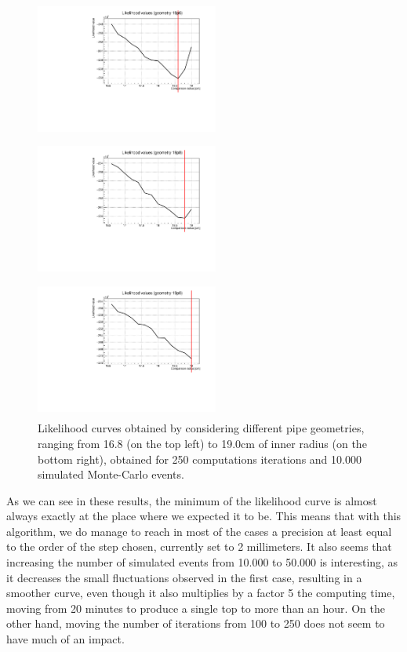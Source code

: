 \documentclass[a4paper, 11pt, twoside, openright]{report}
\begin{document}
\begin{figure}[htbp]
\begin{minipage}[b]{.32\textwidth}
\includegraphics[width=6cm, height=4.6cm]{figs/likelihood250LowStat/likelihood18p6.pdf}
\end{minipage}\hfill
\begin{minipage}[b]{.32\textwidth}
\includegraphics[width=6cm, height=4.6cm]{figs/likelihood250LowStat/likelihood18p8.pdf}
\end{minipage} \hfill
\begin{minipage}[b]{.32\textwidth}
\includegraphics[width=6cm, height=4.6cm]{figs/likelihood250LowStat/likelihood19p0.pdf}
\end{minipage} \hfill
\caption{Likelihood curves obtained by considering different pipe geometries, ranging from 16.8 (on the top left) to 19.0cm of inner radius (on the bottom right), obtained for 250 computations iterations and 10.000 simulated Monte-Carlo events.}
\label{fig:likelihoods3}
\end{figure}

As we can see in these results, the minimum of the likelihood curve is almost always exactly at the place where we expected it to be. This means that with this algorithm, we do manage to reach in most of the cases a precision at least equal to the order of the step chosen, currently set to 2 millimeters. It also seems that increasing the number of simulated events from 10.000 to 50.000 is interesting, as it decreases the small fluctuations observed in the first case, resulting in a smoother curve, even though it also multiplies by a factor 5 the computing time, moving from 20 minutes to produce a single top to more than an hour. On the other hand, moving the number of iterations from 100 to 250 does not seem to have much of an impact.
\end{document}
